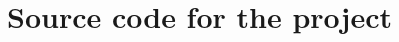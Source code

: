 \documentclass[12pt]{article}
\begin{document}
\section[6]{Source code for the project}





\setcounter{section}{0}
\newpage
\end{document}
